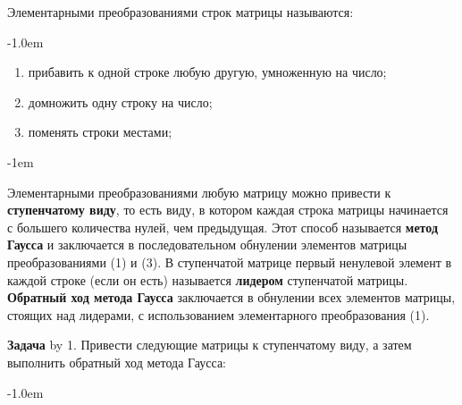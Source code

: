\documentclass[a4paper,10pt]{article}
\def\problem{\textbf{Задача \the\problemnum}\advance\problemnum by 1}
\begin{document}
Элементарными преобразованиями строк матрицы называются:\par\kern-1.0em
\begin{multicols}{3}
	\begin{enumerate}[label=(\arabic*)\,]
		\item прибавить к одной строке любую другую, умноженную на число;
		\item домножить одну строку на число;
		\item поменять строки местами;
	\end{enumerate}
\end{multicols}\par\kern-1em

Элементарными преобразованиями любую матрицу можно привести к \textbf{ступенчатому виду}, то есть виду, в котором каждая строка матрицы начинается с большего количества нулей, чем предыдущая. Этот способ называется \textbf{метод Гаусса} и заключается в последовательном обнулении элементов матрицы преобразованиями (1) и (3). В ступенчатой матрице первый ненулевой элемент в каждой строке (если он есть) называется \textbf{лидером} ступенчатой матрицы. \textbf{Обратный ход метода Гаусса} заключается в обнулении всех элементов матрицы, стоящих над лидерами, с использованием элементарного преобразования (1).


\problem. Привести следующие матрицы к ступенчатому виду, а затем выполнить обратный ход метода Гаусса: \par\kern-1.0em
\end{document}
